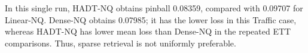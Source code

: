 In this single run, HADT-NQ obtains pinball 0.08359, compared with 0.09707 for Linear-NQ. Dense-NQ obtains 0.07985; it has the lower loss in this Traffic case, whereas HADT-NQ has lower mean loss than Dense-NQ in the repeated ETT comparisons. Thus, sparse retrieval is not uniformly preferable.
